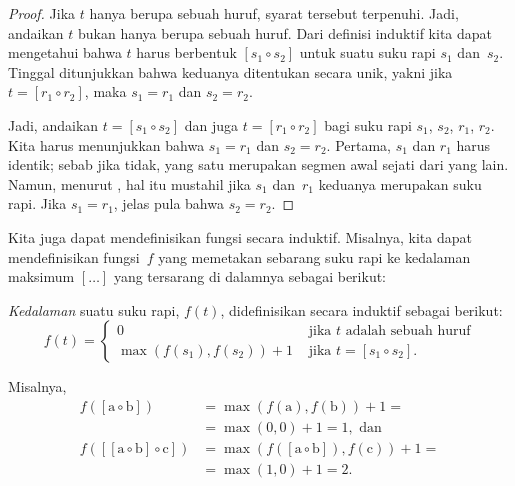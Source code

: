 \documentclass[../../../include/open-logic-section]{subfiles}
\begin{document}
\begin{proof}
  Jika $t$ hanya berupa sebuah huruf, syarat tersebut terpenuhi. Jadi,
  andaikan $t$ bukan hanya berupa sebuah huruf. Dari definisi induktif kita
  dapat mengetahui bahwa $t$ harus berbentuk $[s_1 \circ s_2]$ untuk suatu
  suku rapi $s_1$ dan~$s_2$. Tinggal ditunjukkan bahwa keduanya ditentukan
  secara unik, yakni jika $t = [r_1 \circ r_2]$, maka $s_1 = r_1$ dan
  $s_2 = r_2$.

  Jadi, andaikan $t = [s_1 \circ s_2]$ dan juga $t = [r_1 \circ r_2]$
  bagi suku rapi $s_1$, $s_2$, $r_1$, $r_2$. Kita harus menunjukkan bahwa
  $s_1 = r_1$ dan $s_2 = r_2$. Pertama, $s_1$ dan $r_1$ harus identik;
  sebab jika tidak, yang satu merupakan segmen awal sejati dari yang lain.
  Namun, menurut , hal itu mustahil jika $s_1$
  dan~$r_1$ keduanya merupakan suku rapi. Jika $s_1 = r_1$, jelas pula
  bahwa $s_2 = r_2$.
\end{proof}

Kita juga dapat mendefinisikan fungsi secara induktif. Misalnya, kita dapat
mendefinisikan fungsi~$f$ yang memetakan sebarang suku rapi ke kedalaman
maksimum $[\dots]$ yang tersarang di dalamnya sebagai berikut:

\begin{defn}
   \emph{Kedalaman} suatu suku rapi, $f(t)$,
  didefinisikan secara induktif sebagai berikut:
  \[
  f(t) = \begin{cases}
    0 & \text{ jika $t$ adalah sebuah huruf}\\
    \max(f(s_1), f(s_2)) + 1 & \text{ jika $t = [s_1 \circ s_2]$.}
  \end{cases}
  \]
\end{defn}

Misalnya,
\begin{align*}
  f([\mathrm{a} \circ \mathrm{b}]) & =
    \max(f(\mathrm{a}),f(\mathrm{b})) + 1 = \\
  &= \max(0, 0) + 1 = 1, \text{ dan}\\
  f([[\mathrm{a} \circ \mathrm{b}] \circ \mathrm{c}]) & =
    \max(f([\mathrm{a} \circ \mathrm{b}]), f(\mathrm{c})) + 1 = \\
  & = \max(1,0) + 1 = 2.
\end{align*}
\end{document}

